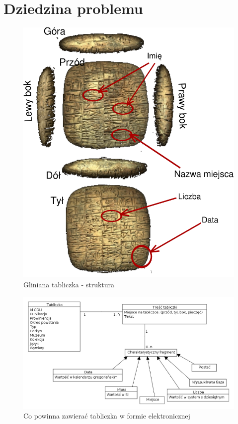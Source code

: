 \documentclass{pracamgr}
\begin{document}
\chapter{Dziedzina problemu}
\begin{figure}
 \centering
 \includegraphics[bb=0 0 342 405]{./diagramy/tabliczka.pdf}
 \caption{Gliniana tabliczka - struktura}
\end{figure}
\begin{figure}
 \centering
 \includegraphics[width=500px,bb=0 0 650 345]{./diagramy/Model-dziedziny.png}
 \caption{Co powinna zawierać tabliczka w formie elektronicznej}
\end{figure}
\end{document}
